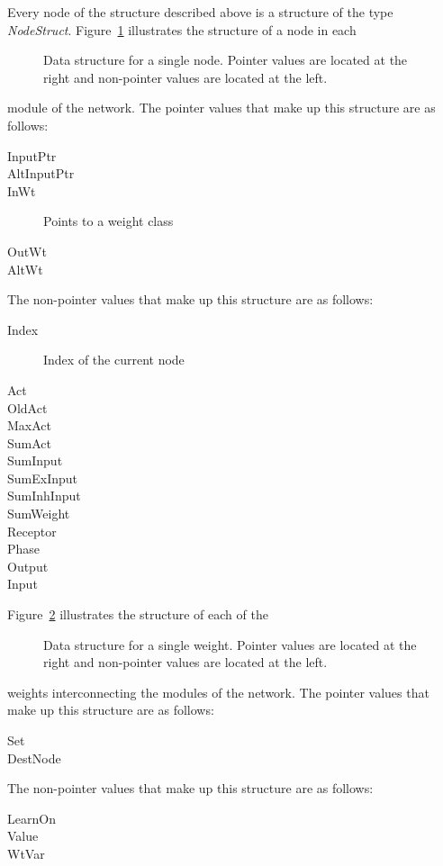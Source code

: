 \documentclass[12pt]{article}
\begin{document}
Every node of the structure described above is a structure of the type
{\em NodeStruct}.
Figure~\ref{nodeStruct} illustrates the structure of a node in each
\begin{figure}[htp]
  \centerline{}
  \caption{Data structure for a single node. Pointer values are
  located at the right and non-pointer values are located at the
  left. }
  \label{nodeStruct}
\end{figure}
module of the network. The pointer values that make up this structure 
are as follows: 
\begin{description}
  \item[InputPtr]
  \item[AltInputPtr]
  \item[InWt] Points to a weight class
  \item[OutWt]
  \item[AltWt]
\end{description}
The non-pointer values that make up this structure are as 
follows:
\begin{description}
  \item[Index] Index of the current node 
  \item[Act]
  \item[OldAct]
  \item[MaxAct]
  \item[SumAct]
  \item[SumInput]
  \item[SumExInput]
  \item[SumInhInput]
  \item[SumWeight]
  \item[Receptor]
  \item[Phase]
  \item[Output]
  \item[Input]
\end{description}
Figure~\ref{weightStruct} illustrates the structure of each of the
\begin{figure}[htp]
  \centerline{}
  \caption{Data structure for a single weight. Pointer values are
  located at the right and non-pointer values are located at the
  left. }
  \label{weightStruct}
\end{figure}
weights interconnecting the modules of the network. The pointer values
that make up this structure are as follows:
\begin{description}
  \item[Set]
  \item[DestNode]
\end{description}
The non-pointer values that make up this structure are as 
follows:
\begin{description}
  \item[LearnOn]
  \item[Value]
  \item[WtVar]
\end{description} 
\end{document}
